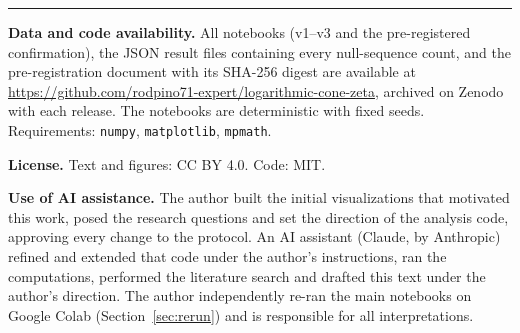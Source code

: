 \documentclass[11pt,a4paper]{article}
\begin{document}
\vspace{3mm}
{\color{muted!40}\hrule}
\vspace{2mm}
{\sffamily\small
\textbf{Data and code availability.} All notebooks (v1--v3 and the pre-registered confirmation), the JSON result files containing every null-sequence count, and the pre-registration document with its SHA-256 digest are available at \url{https://github.com/rodpino71-expert/logarithmic-cone-zeta}, archived on Zenodo with each release. The notebooks are deterministic with fixed seeds. Requirements: \texttt{numpy}, \texttt{matplotlib}, \texttt{mpmath}.

\medskip
\textbf{License.} Text and figures: CC BY 4.0. Code: MIT.

\medskip
\textbf{Use of AI assistance.} The author built the initial visualizations that motivated this work, posed the research questions and set the direction of the analysis code, approving every change to the protocol. An AI assistant (Claude, by Anthropic) refined and extended that code under the author's instructions, ran the computations, performed the literature search and drafted this text under the author's direction. The author independently re-ran the main notebooks on Google Colab (Section~\ref{sec:rerun}) and is responsible for all interpretations.\par}
\end{document}

